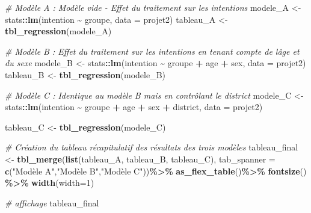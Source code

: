 \documentclass[
]{article}
\newenvironment{Shaded}{\begin{snugshade}}{\end{snugshade}}
\newcommand{\AttributeTok}[1]{\textcolor[rgb]{0.13,0.29,0.53}{#1}}
\newcommand{\CommentTok}[1]{\textcolor[rgb]{0.56,0.35,0.01}{\textit{#1}}}
\newcommand{\DecValTok}[1]{\textcolor[rgb]{0.00,0.00,0.81}{#1}}
\newcommand{\FunctionTok}[1]{\textcolor[rgb]{0.13,0.29,0.53}{\textbf{#1}}}
\newcommand{\NormalTok}[1]{#1}
\newcommand{\OtherTok}[1]{\textcolor[rgb]{0.56,0.35,0.01}{#1}}
\newcommand{\SpecialCharTok}[1]{\textcolor[rgb]{0.81,0.36,0.00}{\textbf{#1}}}
\newcommand{\StringTok}[1]{\textcolor[rgb]{0.31,0.60,0.02}{#1}}
\begin{document}
\begin{Shaded}
\begin{Highlighting}[]
\CommentTok{\# Modèle A : Modèle vide {-} Effet du traitement sur les intentions}
\NormalTok{modele\_A }\OtherTok{\textless{}{-}}\NormalTok{ stats}\SpecialCharTok{::}\FunctionTok{lm}\NormalTok{(intention }\SpecialCharTok{\textasciitilde{}}\NormalTok{ groupe, }\AttributeTok{data =}\NormalTok{ projet2)}
\NormalTok{tableau\_A }\OtherTok{\textless{}{-}} \FunctionTok{tbl\_regression}\NormalTok{(modele\_A)}

\CommentTok{\# Modèle B : Effet du traitement sur les intentions en tenant compte de l\textquotesingle{}âge et du sexe}
\NormalTok{modele\_B }\OtherTok{\textless{}{-}}\NormalTok{ stats}\SpecialCharTok{::}\FunctionTok{lm}\NormalTok{(intention }\SpecialCharTok{\textasciitilde{}}\NormalTok{ groupe }\SpecialCharTok{+}\NormalTok{ age }\SpecialCharTok{+}\NormalTok{ sex, }\AttributeTok{data =}\NormalTok{ projet2)}
\NormalTok{tableau\_B }\OtherTok{\textless{}{-}} \FunctionTok{tbl\_regression}\NormalTok{(modele\_B)}

\CommentTok{\# Modèle C : Identique au modèle B mais en contrôlant le district}
\NormalTok{modele\_C }\OtherTok{\textless{}{-}}\NormalTok{ stats}\SpecialCharTok{::}\FunctionTok{lm}\NormalTok{(intention }\SpecialCharTok{\textasciitilde{}}\NormalTok{ groupe }\SpecialCharTok{+}\NormalTok{ age }\SpecialCharTok{+}\NormalTok{ sex }\SpecialCharTok{+}\NormalTok{ district, }\AttributeTok{data =}\NormalTok{ projet2)}

\NormalTok{tableau\_C }\OtherTok{\textless{}{-}} \FunctionTok{tbl\_regression}\NormalTok{(modele\_C)}

\CommentTok{\# Création du tableau récapitulatif des résultats des trois modèles}
\NormalTok{tableau\_final }\OtherTok{\textless{}{-}} \FunctionTok{tbl\_merge}\NormalTok{(}\FunctionTok{list}\NormalTok{(tableau\_A, tableau\_B, tableau\_C),}
              \AttributeTok{tab\_spanner =} \FunctionTok{c}\NormalTok{(}\StringTok{"Modèle A"}\NormalTok{,}\StringTok{"Modèle B"}\NormalTok{,}\StringTok{"Modèle C"}\NormalTok{))}\SpecialCharTok{\%\textgreater{}\%} \FunctionTok{as\_flex\_table}\NormalTok{()}\SpecialCharTok{\%\textgreater{}\%}
  \FunctionTok{fontsize}\NormalTok{() }\SpecialCharTok{\%\textgreater{}\%} 
  \FunctionTok{width}\NormalTok{(}\AttributeTok{width=}\DecValTok{1}\NormalTok{)}

\CommentTok{\# affichage}
\NormalTok{tableau\_final}
\end{Highlighting}
\end{Shaded}
\end{document}
